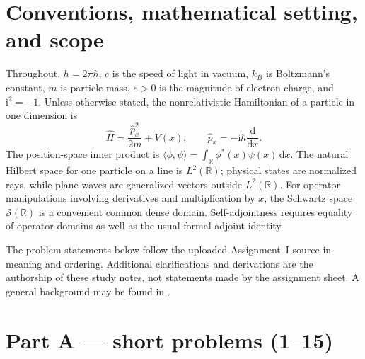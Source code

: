 \documentclass[11pt,a4paper]{article}
\newcommand{\dd}{\mathrm{d}}
\newcommand{\iu}{\mathrm{i}}
\newcommand{\R}{\mathbb R}
\begin{document}
\section{Conventions, mathematical setting, and scope}
Throughout, $h=2\pi\hbar$, $c$ is the speed of light in vacuum, $k_B$ is Boltzmann's constant, $m$ is particle mass, $e>0$ is the magnitude of electron charge, and $\iu^2=-1$. Unless otherwise stated, the nonrelativistic Hamiltonian of a particle in one dimension is
\begin{equation}\label{eq:Hgeneral}
\hat H=\frac{\hat p_x^2}{2m}+V(x),\qquad \hat p_x=-\iu\hbar\frac{\dd}{\dd x}.
\end{equation}
The position-space inner product is $\langle\phi,\psi\rangle=\int_{\R}\phi^*(x)\psi(x)\,\dd x$. The natural Hilbert space for one particle on a line is $L^2(\R)$; physical states are normalized rays, while plane waves are generalized vectors outside $L^2(\R)$. For operator manipulations involving derivatives and multiplication by $x$, the Schwartz space $\mathcal S(\R)$ is a convenient common dense domain. Self-adjointness requires equality of operator domains as well as the usual formal adjoint identity.\par
The problem statements below follow the uploaded Assignment--I source in meaning and ordering. Additional clarifications and derivations are the authorship of these study notes, not statements made by the assignment sheet. A general background may be found in \cite{griffiths,shankar,sakurai,reed_simon}.

\section{Part A --- short problems (1--15)}
\end{document}
